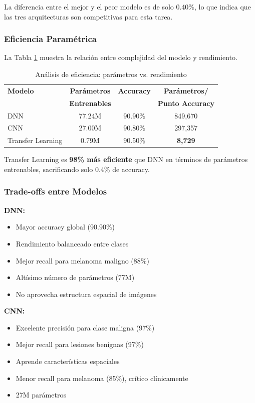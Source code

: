 \documentclass[11pt, a4paper]{article}
\begin{document}
La diferencia entre el mejor y el peor modelo es de solo 0.40\%, lo que indica que las tres arquitecturas son competitivas para esta tarea.

\subsubsection{Eficiencia Paramétrica}

La Tabla \ref{tab:eficiencia} muestra la relación entre complejidad del modelo y rendimiento.

\begin{table}[H]
\centering
\caption{Análisis de eficiencia: parámetros vs. rendimiento}
\label{tab:eficiencia}
\begin{tabular}{@{}lccc@{}}
\toprule
\textbf{Modelo} & \textbf{Parámetros} & \textbf{Accuracy} & \textbf{Parámetros/} \\
 & \textbf{Entrenables} &  & \textbf{Punto Accuracy} \\
\midrule
DNN               & 77.24M & 90.90\% & 849,670 \\
CNN               & 27.00M & 90.80\% & 297,357 \\
Transfer Learning & 0.79M  & 90.50\% & \textbf{8,729} \\
\bottomrule
\end{tabular}
\end{table}

Transfer Learning es \textbf{98\% más eficiente} que DNN en términos de parámetros entrenables, sacrificando solo 0.4\% de accuracy.

\subsubsection{Trade-offs entre Modelos}

\textbf{DNN:}
\begin{itemize}
    \item[+] Mayor accuracy global (90.90\%)
    \item[+] Rendimiento balanceado entre clases
    \item[+] Mejor recall para melanoma maligno (88\%)
    \item[-] Altísimo número de parámetros (77M)
    \item[-] No aprovecha estructura espacial de imágenes
\end{itemize}

\textbf{CNN:}
\begin{itemize}
    \item[+] Excelente precisión para clase maligna (97\%)
    \item[+] Mejor recall para lesiones benignas (97\%)
    \item[+] Aprende características espaciales
    \item[-] Menor recall para melanoma (85\%), crítico clínicamente
    \item[-] 27M parámetros
\end{itemize}
\end{document}
